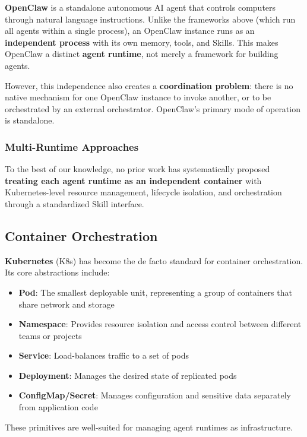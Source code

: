 \textbf{OpenClaw} is a standalone autonomous AI agent that controls computers through natural language instructions. Unlike the frameworks above (which run all agents within a single process), an OpenClaw instance runs as an \textbf{independent process} with its own memory, tools, and Skills. This makes OpenClaw a distinct \textbf{agent runtime}, not merely a framework for building agents.

However, this independence also creates a \textbf{coordination problem}: there is no native mechanism for one OpenClaw instance to invoke another, or to be orchestrated by an external orchestrator. OpenClaw's primary mode of operation is standalone.

\subsubsection{Multi-Runtime Approaches}

To the best of our knowledge, no prior work has systematically proposed \textbf{treating each agent runtime as an independent container} with Kubernetes-level resource management, lifecycle isolation, and orchestration through a standardized Skill interface.

\subsection{Container Orchestration}

\textbf{Kubernetes} (K8s) has become the de facto standard for container orchestration. Its core abstractions include:

\begin{itemize}
    \item \textbf{Pod}: The smallest deployable unit, representing a group of containers that share network and storage
    \item \textbf{Namespace}: Provides resource isolation and access control between different teams or projects
    \item \textbf{Service}: Load-balances traffic to a set of pods
    \item \textbf{Deployment}: Manages the desired state of replicated pods
    \item \textbf{ConfigMap/Secret}: Manages configuration and sensitive data separately from application code
\end{itemize}

These primitives are well-suited for managing agent runtimes as infrastructure.

